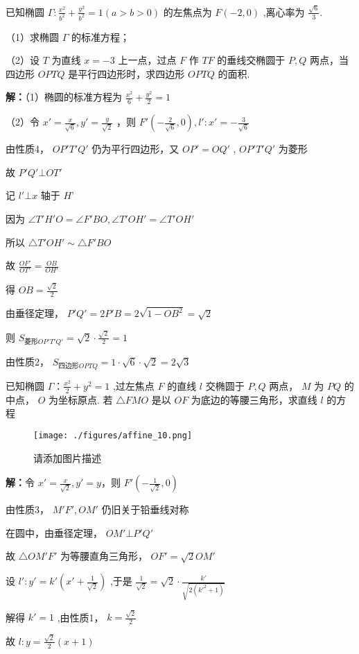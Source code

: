 \begin{example}{}
已知椭圆 \(\Gamma:\frac{x^2}{b^2}+\frac{y^2}{b^2}=1(a>b>0)\) 的左焦点为 \(F(-2,0)\) ,离心率为 \(\frac{\sqrt{6}}{3}\).

（1）求椭圆 \(\Gamma\) 的标准方程；

（2）设 \(T\) 为直线 \(x=-3\) 上一点，过点 \(F\) 作 \(TF\) 的垂线交椭圆于 \(P,Q\) 两点，当四边形 \(OPTQ\) 是平行四边形时，求四边形 \(OPTQ\) 的面积.

\textbf{解：}（1）椭圆的标准方程为 \(\frac{x^2}{6}+\frac{y^2}{2}=1\)

（2）令 \(x'=\frac{x}{\sqrt{6}},y'=\frac{y}{\sqrt{2}}\) ，则 \(F'\left(-\frac{2}{\sqrt{6}},0\right) , l':x'=-\frac{3}{\sqrt{6}}\)

由性质4， \(OP'T'Q'\) 仍为平行四边形，又 \(OP'=OQ'\) , \(OP'T'Q'\) 为菱形

故 \(P'Q'\bot OT'\)

记  \(l'\bot x\) 轴于 \(H’\) 

因为 \(\angle T'H'O=\angle F'BO,\angle T'OH'=\angle T'OH'\)

所以 \(\triangle T'OH'\sim\triangle F'BO\)

故 \(\frac{OF'}{OT'}=\frac{OB}{OH'}\)

得 \(OB=\frac{\sqrt{2}}{2}\)

由垂径定理， \(P'Q'=2P'B=2\sqrt{1-OB^2}=\sqrt{2}\)

则 \(S_{菱形OP'T'Q'}=\sqrt{2}\cdot\frac{\sqrt{2}}{2}=1\)

由性质2， \(S_{四边形OPTQ}=1\cdot \sqrt{6}\cdot\sqrt{2}=2\sqrt{3}\) 
\end{example}

\begin{example}{}
已知椭圆 \(\Gamma：\frac{x^2}{2}+y^2=1\) ,过左焦点 \(F\) 的直线 \(l\) 交椭圆于 \(P,Q\) 两点， \(M\) 为 \(PQ\) 的中点， \(O\) 为坐标原点. 若 \(\triangle FMO\) 是以 \(OF\) 为底边的等腰三角形，求直线 \(l\)  的方程
\begin{figure}[ht]
\centering
\texttt{[image: ./figures/affine\_10.png]}
\caption{请添加图片描述} \label{affine_fig10}
\end{figure}
\textbf{解：}令 \(x'=\frac{x}{\sqrt{2}},y'=y\)，则 \(F'(-\frac{1}{\sqrt{2}},0)\)

由性质3， \(M'F',OM'\) 仍旧关于铅垂线对称

在圆中，由垂径定理， \(OM'\bot P'Q'\)

故 \(\triangle OM'F'\) 为等腰直角三角形， \(OF'=\sqrt{2} OM'\)

设 \(l':y'=k'\left(x'+\frac{1}{\sqrt{2}}\right)\) ,于是 \(\frac{1}{\sqrt{2}}=\sqrt{2}\cdot \frac{k'}{\sqrt{2(k'^2+1)}}\)

解得 \(k'=1\) ,由性质1， \(k=\frac{\sqrt{2}}{2}\)

故 \(l:y=\frac{\sqrt{2}}{2}(x+1)\) 
\end{example}

